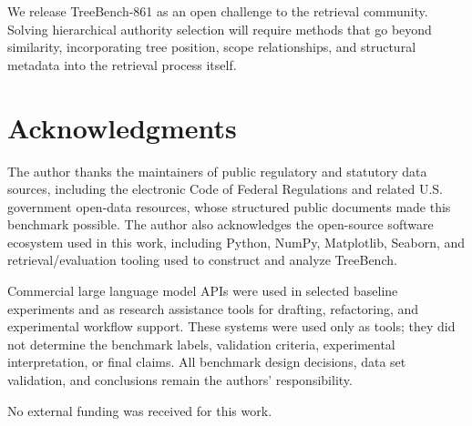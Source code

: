 \documentclass[11pt]{article}
\begin{document}
We release TreeBench-861 as an open challenge to the retrieval community. Solving hierarchical authority selection will require methods that go beyond similarity, incorporating tree position, scope relationships, and structural metadata into the retrieval process itself.


\section*{Acknowledgments}

The author thanks the maintainers of public regulatory and statutory data sources, including the electronic Code of Federal Regulations and related U.S. government open-data resources, whose structured public documents made this benchmark possible. The author also acknowledges the open-source software ecosystem used in this work, including Python, NumPy, Matplotlib, Seaborn, and retrieval/evaluation tooling used to construct and analyze TreeBench.

Commercial large language model APIs were used in selected baseline experiments and as research assistance tools for drafting, refactoring, and experimental workflow support. These systems were used only as tools; they did not determine the benchmark labels, validation criteria, experimental interpretation, or final claims. All benchmark design decisions, data set validation, and conclusions remain the authors' responsibility.

No external funding was received for this work.



\end{document}
